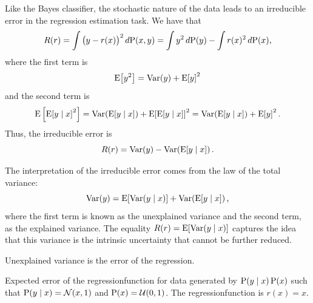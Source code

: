 Like the Bayes \gls{classifier}, the stochastic nature of the data leads to an irreducible
error in the regression estimation task.  We have that
\begin{equation*}
  R(r) = \int \big(y - r(x)\big)^2\, d\!\operatorname{P}(x, y) =
    \int y^2\, d\!\operatorname{P}(y) - \int r(x)^2\, d\!\operatorname{P}(x)\text{,}
\end{equation*}
where the first term is
\[
  \operatorname{E}\!\left[y^2\right] = \operatorname{Var}(y) + \operatorname{E}\!\left[y\right]^2
\]
and the second term is
\[
  \E\left[\E\!\left[y \mid x\right]^2\right] =
    \Var\!\left(\E\!\left[y \mid x\right]\right) + \E\!\left[\E\!\left[y \mid x\right]\right]^2 =
    \Var\!\left(\E\!\left[y \mid x\right]\right) + \E\!\left[y\right]^2\text{.}
\]
Thus, the irreducible error is
\[
  R(r) = \operatorname{Var}(y) - \operatorname{Var}\!\left(\operatorname{E}\!\left[y \mid x\right]\right) \text{.}
\]

The interpretation of the irreducible error comes from the law of the total variance:
\begin{equation*}
  \operatorname{Var}(y) = \operatorname{E}\!\left[ \operatorname{Var}(y \mid x) \right] + \operatorname{Var}\!\left(\operatorname{E}\!\left[y \mid x\right]\right)\text{,}
\end{equation*}
where the first term is known as the unexplained variance and the second term, as the
explained variance.  The equality $R(r) = \operatorname{E}\!\left[ \operatorname{Var}(y \mid x) \right]$
captures the idea that this variance is the intrinsic uncertainty that cannot be further
reduced.

\begin{figurebox}[label=fig:explained-unexplained-variance]{Unexplained variance is the
  error of the regression.}
  \centering
  \tcblower
  Expected error of the \gls{regressionfunction} for data generated by
  $\operatorname{P}(y \mid x) \operatorname{P}(x)$ such that $\operatorname{P}(y \mid x) = \mathcal{N}(x, 1)$ and
  $\operatorname{P}(x) = \mathcal{U}(0, 1)$.  The \gls{regressionfunction} is $r(x) = x$.
\end{figurebox}


